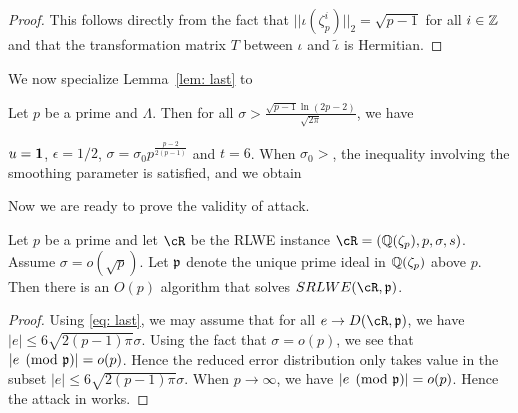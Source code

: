 \documentclass{amsart}
\begin{document}
\begin{proof}
This follows directly from the fact that $||\iota(\zeta_p^i)||_2 = \sqrt{p-1}$ for all $i \in \mathbb{Z}$ and that the transformation matrix $T$ between $\iota$ and $\tilde{\iota}$ is Hermitian.
\end{proof}


We now specialize Lemma~\ref{lem: last} to

\begin{Prop}
Let $p$ be a prime and $\Lambda$. Then for all $\sigma > \frac{\sqrt{p-1} \ln(2p-2)}{\sqrt{2 \pi}}$, we have
\end{Prop}
$u = {\bf 1}$, $\epsilon = 1/2$, $\sigma = \sigma_0 p^{\frac{p-2}{2(p-1)}}$ and $t = 6$. When $\sigma_0 > $, the inequality involving the smoothing parameter is satisfied, and we obtain

Now we are ready to prove the validity of attack.
\begin{theorem}
Let $p$ be a prime and let $\cR$ be the RLWE instance $\cR = (\bQ(\zeta_p), p, \sigma,s)$.
Assume $\sigma = o(\sqrt{p})$. Let $\mathfrak{p}$ denote the unique prime ideal in $\mathbb{Q}(\zeta_p)$ above $p$. Then there is an $O(p)$ algorithm that solves $SRLWE(\cR,\fp)$.
\end{theorem}

\begin{proof}
Using \ref{eq: last}, we may assume that for all $e \to D(\cR,\fp)$, we have $|e|\leq 6\sqrt{2(p-1)\pi} \sigma$. Using the fact that $\sigma = o(p)$, we see that $|e \pmod{\mathfrak{p}}| = o(p)$. Hence the reduced error distribution only takes value in the subset
$|e|\leq 6\sqrt{2(p-1)\pi} \sigma$. When $p \to \infty$, we have $|e \pmod {\mathfrak{p}}| = o(p)$.  Hence the attack in \cite{elos2015weak} works.
\end{proof}
\fi
\end{document}
